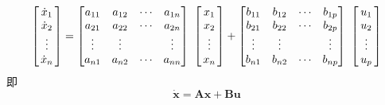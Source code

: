 \begin{equation}
	\begin{bmatrix}
		\dot{x}_1\\
		\dot{x}_2\\
		\hspace*{2mm}\vdots\hspace*{2mm}\\
		\dot{x}_n
	\end{bmatrix}
	=
	\begin{bmatrix}
		a_{11} & a_{12}  & \cdots & a_{1n}\\
		a_{21} & a_{22}  & \cdots & a_{2n}\\
		\vdots & \vdots &  & \vdots\\
		a_{n1} & a_{n2}  & \cdots & a_{nn}
	\end{bmatrix}
	\,\,
	\begin{bmatrix}
		x_1\\
		x_2\\
		\hspace*{2mm}\vdots\hspace*{2mm}\\
		x_{n}
	\end{bmatrix}
	+
	\begin{bmatrix}
		b_{11} & b_{12}  & \cdots & b_{1p}\\
		b_{21} & b_{22}  & \cdots & b_{2p}\\
		\vdots & \vdots &  & \vdots\\
		b_{n1} & b_{n2}  & \cdots & b_{np}
	\end{bmatrix}
	\,\,
	\begin{bmatrix}
		{u}_1\\
		{u}_2\\
		\hspace*{2mm}\vdots\hspace*{2mm}\\
		{u}_p
	\end{bmatrix}
\end{equation}
即
\begin{equation}
	\bm{\dot{x}} = \bm{Ax} + \bm{Bu}
\end{equation}

